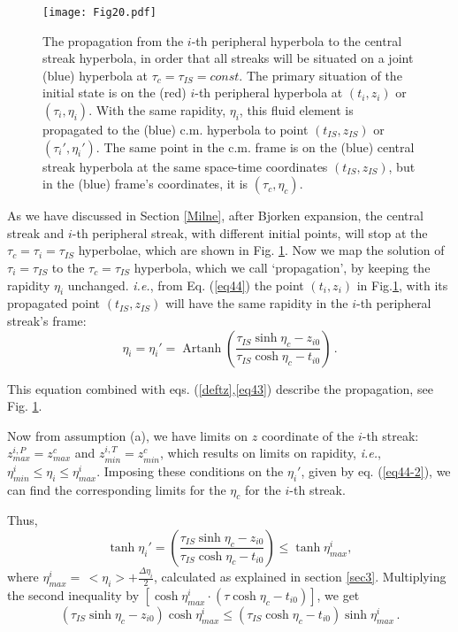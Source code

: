 \documentclass[aps,prc,twocolumn,floatfix,showpacs,a4paper,
nofootinbib,amsmath,amssymb]{revtex4-1}
\newcommand{\be}{\begin{equation}}
\newcommand{\ee}{\end{equation}}
\DeclareMathOperator{\Artanh}{Artanh}
\begin{document}
\begin{figure}[htb]     %
\begin{center}
\resizebox{1.01\columnwidth}{!}
{\texttt{[image: Fig20.pdf]}}
\caption{
The propagation from the $i$-th peripheral hyperbola to the
central streak hyperbola, in order that all streaks will be situated 
on a joint (blue) hyperbola at $\tau_c =\tau_{IS} = const.$
The primary situation of the initial state is on the (red)
$i$-th peripheral hyperbola at $(t_i, z_i)$ or $(\tau_i, \eta_i)$.
With the same rapidity, $\eta_i$, this fluid element is propagated
to the (blue) c.m. hyperbola to point 
$(t_{IS}, z_{IS})$ or $(\tau_{i} ', \eta_i ')$.
The same point in the c.m. frame is on the (blue) central streak hyperbola
at the same space-time coordinates $(t_{IS}, z_{IS})$, but in the
(blue) frame's coordinates, it is $(\tau_{c}, \eta_c)$.
}
\label{propag}
\end{center}
\end{figure}        %



As we have discussed in Section \ref{Milne}, after Bjorken expansion, 
the central streak and $i$-th peripheral streak, with different initial 
points,  
will stop at the $\tau_c = \tau_i = \tau_{IS}$ hyperbolae, which are shown 
in Fig. \ref{propag}. Now we map the solution of $\tau_i = \tau_{IS}$ to 
the $\tau_c = \tau_{IS}$ hyperbola, 
which we call `propagation', by keeping the 
rapidity $\eta_i$ unchanged. 
{\it i.e.}, from Eq. (\ref{eq44}) the point $(t_i, z_i)$ in Fig.\ref{propag}, with its propagated point $(t_{IS}, z_{IS})$ will have the same 
rapidity in the $i$-th peripheral streak's frame:
\be
\eta_i = \eta_i ' =
      \Artanh\left(\frac{\tau_{IS} \sinh \eta_c - z_{i0}}{\tau_{IS} \cosh \eta_c - t_{i0}}	
\right) \,.
\label{eq44-2}
\ee

This equation combined with eqs. (\ref{deftz},\ref{eq43}) describe the propagation, see Fig. \ref{propag}.


Now from assumption (a), we have limits on $z$ coordinate of the $i$-th
streak: $z_{max}^{i,P} = z_{max}^c$ and $z_{min}^{i,T} = z_{min}^c$, which results on limits on rapidity, {\it i.e.},  
$\eta_{min}^i\le \eta_i \le \eta_{max}^i$.
Imposing these conditions on the $\eta_i '$, given by eq. (\ref{eq44-2}), we can find the corresponding limits for the $\eta_c$ for the $i$-th streak. 

Thus, 
\be
\tanh \eta_i' = 
\left(\frac{\tau_{IS} \sinh \eta_c -z_{i0}}
{\tau_{IS} \cosh \eta_c - t_{i0}}\right)
\le \tanh \eta_{max}^{i} ,
\label{thetam}
\ee
where $\eta_{max}^{i}=\, <\eta_i> + \frac{\Delta\eta_i}{2}$, calculated as explained in section \ref{sec3}. 
Multiplying the second inequality by
$\left[\cosh \eta_{max}^{i} \cdot (\tau \cosh \eta_c-t_{i0})\right]$,
we get 
\be
(\tau_{IS} \sinh \eta_c -z_{i0}) \cosh \eta_{max}^{i}  \le
(\tau_{IS} \cosh \eta_c -t_{i0}) \sinh \eta_{max}^{i} \,.
\ee
\end{document}
